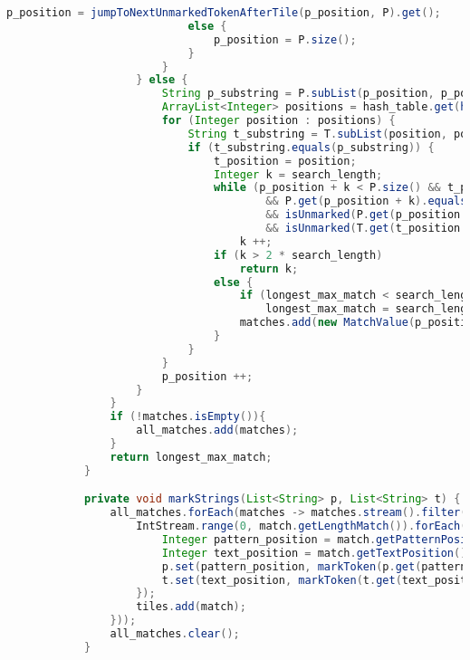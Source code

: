 \begin{lstlisting}[language=java]
                                p_position = jumpToNextUnmarkedTokenAfterTile(p_position, P).get();
                            else {
                                p_position = P.size();
                            }
                        }
                    } else {
                        String p_substring = P.subList(p_position, p_position + search_length).stream().collect(Collectors.joining());
                        ArrayList<Integer> positions = hash_table.get(hash(p_substring));
                        for (Integer position : positions) {
                            String t_substring = T.subList(position, position + search_length).stream().collect(Collectors.joining());
                            if (t_substring.equals(p_substring)) {
                                t_position = position;
                                Integer k = search_length;
                                while (p_position + k < P.size() && t_position + k < T.size()
                                        && P.get(p_position + k).equals(T.get(t_position + k))
                                        && isUnmarked(P.get(p_position + k))
                                        && isUnmarked(T.get(t_position + k)))
                                    k ++;
                                if (k > 2 * search_length)
                                    return k;
                                else {
                                    if (longest_max_match < search_length)
                                        longest_max_match = search_length;
                                    matches.add(new MatchValue(p_position, t_position, k));
                                }
                            }
                        }
                        p_position ++;
                    }
                }
                if (!matches.isEmpty()){
                    all_matches.add(matches);
                }
                return longest_max_match;
            }

            private void markStrings(List<String> p, List<String> t) {
                all_matches.forEach(matches -> matches.stream().filter(match -> !isOccluded(match, tiles)).forEach(match -> {
                    IntStream.range(0, match.getLengthMatch()).forEach(i -> {
                        Integer pattern_position = match.getPatternPosition() + i;
                        Integer text_position = match.getTextPosition() + i;
                        p.set(pattern_position, markToken(p.get(pattern_position)));
                        t.set(text_position, markToken(t.get(text_position)));
                    });
                    tiles.add(match);
                }));
                all_matches.clear();
            }


\end{lstlisting}
